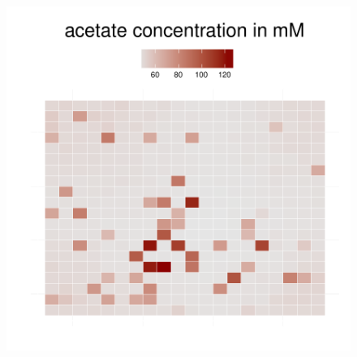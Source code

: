 \begin{figure}[h!]
{\begin{minipage}[t]{0.3\textwidth}
  \end{minipage}
  \begin{minipage}[t]{0.3\textwidth}
    \includegraphics[width=\textwidth]{../results/Bcoli_20x20_seed176_ace50.pdf}
  \end{minipage}
  }
\end{figure}
